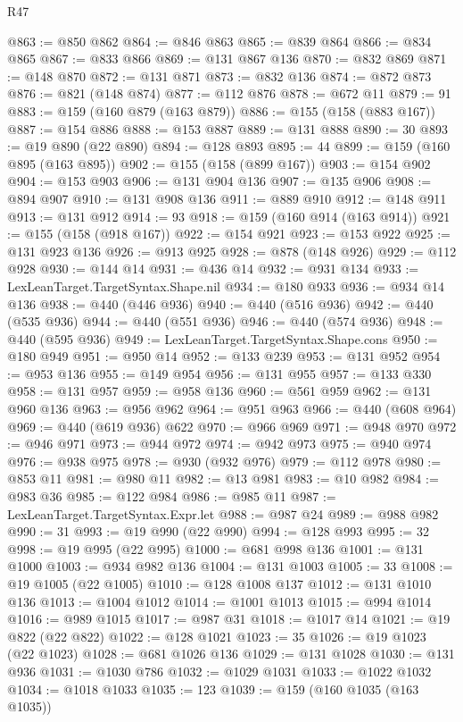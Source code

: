 \begin{lexlean}{R47}
\begin{coremodule}
@863 := @850 @862
@864 := @846 @863
@865 := @839 @864
@866 := @834 @865
@867 := @833 @866
@869 := @131 @867 @136
@870 := @832 @869
@871 := @148 @870
@872 := @131 @871
@873 := @832 @136
@874 := @872 @873
@876 := @821 (@148 @874)
@877 := @112 @876
@878 := @672 @11
@879 := 91
@883 := @159 (@160 @879 (@163 @879))
@886 := @155 (@158 (@883 @167))
@887 := @154 @886
@888 := @153 @887
@889 := @131 @888
@890 := 30
@893 := @19 @890 (@22 @890)
@894 := @128 @893
@895 := 44
@899 := @159 (@160 @895 (@163 @895))
@902 := @155 (@158 (@899 @167))
@903 := @154 @902
@904 := @153 @903
@906 := @131 @904 @136
@907 := @135 @906
@908 := @894 @907
@910 := @131 @908 @136
@911 := @889 @910
@912 := @148 @911
@913 := @131 @912
@914 := 93
@918 := @159 (@160 @914 (@163 @914))
@921 := @155 (@158 (@918 @167))
@922 := @154 @921
@923 := @153 @922
@925 := @131 @923 @136
@926 := @913 @925
@928 := @878 (@148 @926)
@929 := @112 @928
@930 := @144 @14
@931 := @436 @14
@932 := @931 @134
@933 := LexLeanTarget.TargetSyntax.Shape.nil
@934 := @180 @933
@936 := @934 @14 @136
@938 := @440 (@446 @936)
@940 := @440 (@516 @936)
@942 := @440 (@535 @936)
@944 := @440 (@551 @936)
@946 := @440 (@574 @936)
@948 := @440 (@595 @936)
@949 := LexLeanTarget.TargetSyntax.Shape.cons
@950 := @180 @949
@951 := @950 @14
@952 := @133 @239
@953 := @131 @952
@954 := @953 @136
@955 := @149 @954
@956 := @131 @955
@957 := @133 @330
@958 := @131 @957
@959 := @958 @136
@960 := @561 @959
@962 := @131 @960 @136
@963 := @956 @962
@964 := @951 @963
@966 := @440 (@608 @964)
@969 := @440 (@619 @936) @622
@970 := @966 @969
@971 := @948 @970
@972 := @946 @971
@973 := @944 @972
@974 := @942 @973
@975 := @940 @974
@976 := @938 @975
@978 := @930 (@932 @976)
@979 := @112 @978
@980 := @853 @11
@981 := @980 @11
@982 := @13 @981
@983 := @10 @982
@984 := @983 @36
@985 := @122 @984
@986 := @985 @11
@987 := LexLeanTarget.TargetSyntax.Expr.let
@988 := @987 @24
@989 := @988 @982
@990 := 31
@993 := @19 @990 (@22 @990)
@994 := @128 @993
@995 := 32
@998 := @19 @995 (@22 @995)
@1000 := @681 @998 @136
@1001 := @131 @1000
@1003 := @934 @982 @136
@1004 := @131 @1003
@1005 := 33
@1008 := @19 @1005 (@22 @1005)
@1010 := @128 @1008 @137
@1012 := @131 @1010 @136
@1013 := @1004 @1012
@1014 := @1001 @1013
@1015 := @994 @1014
@1016 := @989 @1015
@1017 := @987 @31
@1018 := @1017 @14
@1021 := @19 @822 (@22 @822)
@1022 := @128 @1021
@1023 := 35
@1026 := @19 @1023 (@22 @1023)
@1028 := @681 @1026 @136
@1029 := @131 @1028
@1030 := @131 @936
@1031 := @1030 @786
@1032 := @1029 @1031
@1033 := @1022 @1032
@1034 := @1018 @1033
@1035 := 123
@1039 := @159 (@160 @1035 (@163 @1035))

\end{coremodule}
\end{lexlean}
